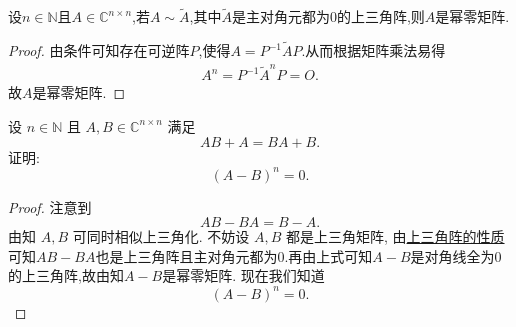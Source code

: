 \documentclass[../../main.tex]{subfiles}%
\begin{document}
\begin{proposition}\label{proposition:与主对角元都为0的上三角阵相似的矩阵一定是幂零阵}
设$n\in \mathbb{N}$且$A\in \mathbb{C}^{n\times n}$,若$A\sim \widetilde{A}$,其中$\widetilde{A}$是主对角元都为0的上三角阵,则$A$是幂零矩阵.
\end{proposition}
\begin{proof}

由条件可知存在可逆阵$P$,使得$A=P^{-1}\widetilde{A}P$.从而根据矩阵乘法易得
\begin{align*}
A^n=P^{-1}\widetilde{A}^nP=O.
\end{align*}
故$A$是幂零矩阵.

\end{proof}

\begin{example}
设 $n \in \mathbb{N}$ 且 $A, B \in \mathbb{C}^{n \times n}$ 满足
\[
AB + A = BA + B.
\]
证明:
\[
(A - B)^n = 0.
\]
\end{example}
\begin{proof}

注意到
\[
AB - BA = B - A.
\]
由知 $A, B$ 可同时相似上三角化. 不妨设 $A, B$ 都是上三角矩阵, 由\hyperref[proposition:上三角阵性质]{上三角阵的性质}可知$AB-BA$也是上三角阵且主对角元都为0.再由上式可知$A - B$是对角线全为0的上三角阵,故由知$A-B$是幂零矩阵. 现在我们知道
\[
(A - B)^n = 0.
\]

\end{proof}
\end{document}
